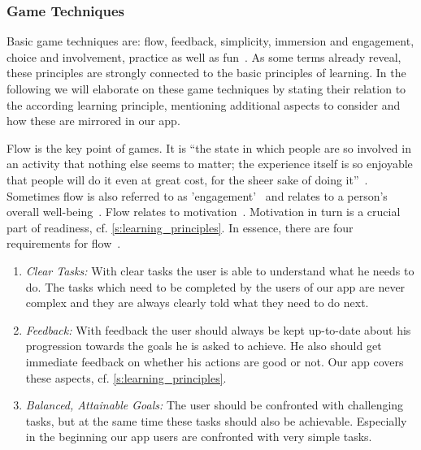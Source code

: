 \subsubsection{Game Techniques}
\label{s:game_techniques}
Basic game techniques are: flow, feedback, simplicity, immersion and engagement, choice and involvement, practice as well as fun~\cite{murphy2011games}.
As some terms already reveal, these principles are strongly connected to the basic principles of learning.
In the following we will elaborate on these game techniques by stating their relation to the according learning principle, mentioning  additional aspects to consider and how these are mirrored in our app.

\begin{description}[leftmargin=0cm]
	\item[Flow:] Flow is the key point of games. It is ``the state in which people are so involved in an activity that nothing else seems to matter; the experience itself is so enjoyable that people will do it even at great cost, for the sheer sake of doing it''~\cite{csikszentmihalyi1990flow}.
Sometimes flow is also referred to as 'engagement'~\cite{murphy2011games} and relates to a person's overall well-being~\cite{seligman2012flourish}. 
Flow relates to motivation~\cite{csikszentmihalyi1990flow, csikszentmihalyi1997finding}. Motivation in turn is a crucial part of readiness, cf. \autoref{s:learning_principles}.
In essence, there are four requirements for flow~\cite{csikszentmihalyi1990flow, csikszentmihalyi1997finding, schell2008art}.
	\begin{enumerate}
		\item \textit{Clear Tasks:} With clear tasks the user is able to understand what he needs to do. 
The tasks which need to be completed by the users of our app are never complex and they are always clearly told what they need to do next. 
		\item \textit{Feedback:} With feedback the user should always be kept up-to-date about his progression towards the goals he is asked to achieve. 
He also should get immediate feedback on whether his actions are good or not. 
Our app covers these aspects, cf. \autoref{s:learning_principles}.
		\item \textit{Balanced, Attainable Goals:} The user should be confronted with challenging tasks, but at the same time these tasks should also be achievable. 
Especially in the beginning our app users are confronted with very simple tasks.

\end{enumerate}
\end{description}
